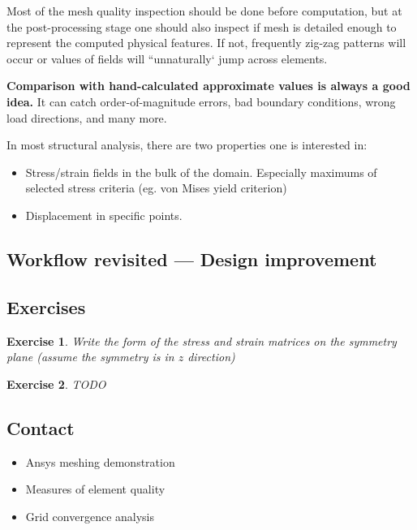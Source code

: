 \documentclass{article}
\newtheorem{exercise}{Exercise}[section]
\begin{document}
Most of the mesh quality inspection should be done before computation, but at the post-processing stage one should also inspect if mesh is detailed enough to represent the computed physical features. If not, frequently zig-zag patterns will occur or values of fields will ``unnaturally` jump across elements.

{\bf Comparison with hand-calculated approximate values is always a good idea.} It can catch order-of-magnitude errors, bad boundary conditions, wrong load directions, and many more.

\begin{center}\end{center}

In most structural analysis, there are two properties one is interested in:
\begin{itemize}
    \item Stress/strain fields in the bulk of the domain. Especially maximums of selected stress criteria (eg. von Mises yield criterion)
    \item Displacement in specific points.
\end{itemize}

\subsection{Workflow revisited --- Design improvement}

\subsection*{Exercises}
\begin{exercise}
    Write the form of the stress and strain matrices on the symmetry plane (assume the symmetry is in $z$ direction)
\end{exercise}
\begin{exercise}
    TODO
\end{exercise}

\subsection*{Contact}
\begin{itemize}
    \item Ansys meshing demonstration
    \item Measures of element quality
    \item Grid convergence analysis
\end{itemize}
\end{document}
